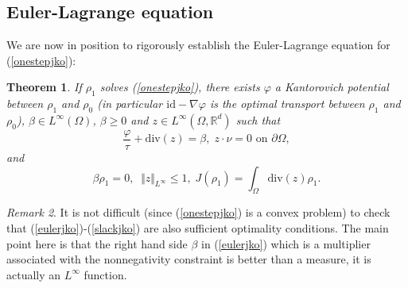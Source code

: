 \documentclass[12pt, a4paper]{article}
\numberwithin{equation}{section}
\theoremstyle{plain}
\newtheorem{thm}{Theorem}[section]
\theoremstyle{definition}
\theoremstyle{remark}
\newtheorem{rem}[thm]{Remark}
\newcommand{\R}{\mathbb{R}}
\newcommand{\id}{\mathrm{id}}
\newcommand{\dive}{\mathrm{div}}
\newcommand\pref[1]{(\ref{#1})}
\begin{document}
 
 \subsection{Euler-Lagrange equation}\label{subsec-oc}


We are now in position to rigorously establish the Euler-Lagrange equation for \pref{onestepjko}:


\begin{thm}\label{eulertvjko}
If $\rho_1$ solves \pref{onestepjko}, there exists $\varphi$ a Kantorovich potential between $\rho_1$ and $\rho_0$ (in particular $\id -\nabla \varphi$ is the optimal transport between $\rho_1$ and $\rho_0$), $\beta\in L^{\infty} (\Omega)$, $\beta\ge 0$ and $z\in L^{\infty}(\Omega, \R^d)$ such that
\begin{equation}\label{eulerjko}
\frac{\varphi}{\tau}+\dive(z)=\beta, \; z\cdot{\nu} =0 \mbox{ on $\partial \Omega$}, 
\end{equation}
and 
\begin{equation}\label{slackjko}
\beta \rho_1=0, \; \; \Vert z \Vert_{L^{\infty}} \le 1, \; J(\rho_1)=\int_{\Omega} \dive(z) \rho_1. 
\end{equation}

\end{thm}

\begin{rem}
It is not difficult (since \pref{onestepjko} is a convex problem) to check that \pref{eulerjko}-\pref{slackjko} are also sufficient optimality conditions. The main point here is that the right hand side $\beta$ in \pref{eulerjko}  which is a multiplier associated with the nonnegativity constraint is better than a measure, it is actually an $L^{\infty}$ function.
\end{rem} 
\end{document}
